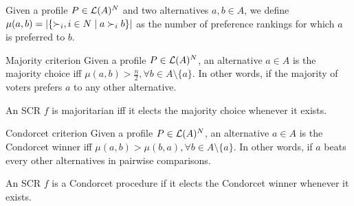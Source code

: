 	Given a profile $P\in\mathcal{L}(A)^{N}$ and two alternatives $a,b\in A$, we define $\mu(a,b)=|\{\mathbin{\prefi}, i \in N \suchthat a\prefi b\}|$ as the number of preference rankings for which $a$ is preferred to $b$. 
	
	\begin{genthm}{Majority criterion}
	Given a profile $P\in\mathcal{L}(A)^{N}$, an alternative $a\in A$ is the majority choice iff $\mu(a,b)> \frac{n}{2}, \forall b\in{A\setminus{\{a\}}}$. In other words, if the majority of voters prefers $a$ to any other alternative.
	
	An \acs{SCR} $f$ is majoritarian iff it elects the majority choice whenever it exists.
	\end{genthm}
	
	\begin{genthm}{Condorcet criterion}
	Given a profile $P\in\mathcal{L}(A)^{N}$, an alternative $a\in A$ is the Condorcet winner iff $\mu(a,b)> \mu(b,a), \forall b\in{A\setminus{\{a\}}}$. In other words, if $a$ beats every other alternatives in pairwise comparisons.
	
	An \acs{SCR} $f$ is a Condorcet procedure if it elects the Condorcet winner whenever it exists.	
	\end{genthm}

